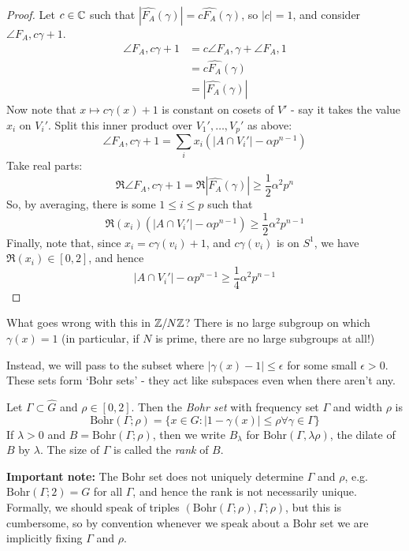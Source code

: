\documentclass[10pt,a4paper]{article}
\begin{document}
\begin{proof}
  Let $c \in \mathbb{C}$ such that $|\hat{F_A}(\gamma)| = c\hat{F_A}(\gamma)$, so $|c| = 1$, and consider $\angle{F_A, c\gamma+1}$.
  \begin{align*}
    \angle{F_A, c\gamma + 1} &= c \angle{F_A, \gamma} + \angle{F_A, 1}\\
    &= c\hat{F_A}(\gamma)\\
    &= |\hat{F_A}(\gamma)|
  \end{align*}
  Now note that $x \mapsto c\gamma(x)+1$ is constant on cosets of $V'$ - say it takes the value $x_i$ on $V_i'$. Split this inner product over $V_1', \ldots, V_p'$ as above:
  \[\angle{F_A, c\gamma+1} = \sum_i x_i \left(|A \cap V_i'| - \alpha p^{n-1}\right)\]
  Take real parts:
  \[\Re\angle{F_A, c\gamma +1} = \Re |\hat{F_A}(\gamma)| \geq \frac{1}{2}\alpha^2p^n\]
  So, by averaging, there is some $1 \leq i \leq p$ such that
  \[\Re(x_i)\left(|A\cap V_i'| - \alpha p^{n-1}\right) \geq \frac{1}{2}\alpha^2 p^{n-1}\]
  Finally, note that, since $x_i = c\gamma(v_i) +1$, and $c \gamma(v_i)$ is on $S^1$, we have $\Re(x_i) \in [0,2]$, and hence
  \[|A\cap V_i'| - \alpha p^{n-1} \geq \frac{1}{4}\alpha^2 p^{n-1}\]
\end{proof}
What goes wrong with this in $\mathbb{Z}/N\mathbb{Z}$? There is no large subgroup on which $\gamma(x) = 1$ (in particular, if $N$ is prime, there are no large subgroups at all!)

Instead, we will pass to the subset where $|\gamma(x)-1|\leq \epsilon$ for some small $\epsilon > 0$. These sets form `Bohr sets' - they act like subspaces even when there aren't any.

\begin{definition}
  Let $\Gamma \subset \hat{G}$ and $\rho \in [0,2]$. Then the \emph{Bohr set} with frequency set $\Gamma$ and width $\rho$ is
  \[\text{Bohr}(\Gamma; \rho) = \{x \in G : |1-\gamma(x)| \leq \rho \forall \gamma \in \Gamma\}\]
  If $\lambda >0$ and $B = \text{Bohr}(\Gamma;\rho)$, then we write $B_\lambda$ for $\text{Bohr}(\Gamma,\lambda\rho)$, the dilate of $B$ by $\lambda$. The size of $\Gamma$ is called the \emph{rank} of $B$.
\end{definition}
\textbf{Important note:} The Bohr set does not uniquely determine $\Gamma$ and $\rho$, e.g. $\text{Bohr}(\Gamma;2) = G$ for all $\Gamma$, and hence the rank is not necessarily unique. Formally, we should speak of triples $(\text{Bohr}(\Gamma; \rho), \Gamma; \rho)$, but this is cumbersome, so by convention whenever we speak about a Bohr set we are implicitly fixing $\Gamma$ and $\rho$.
\end{document}
